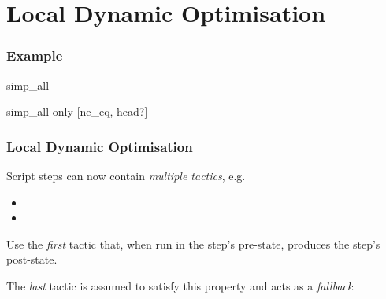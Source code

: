 \section{Local Dynamic Optimisation}

\begin{frame}[fragile]
  \frametitle{Example}

  \begin{minipage}{.2\textwidth}
    \begin{leancode}
      simp_all
    \end{leancode}
  \end{minipage}
  \Longrightarrow
  \begin{minipage}{.5\textwidth}
    \begin{leancode}
      simp_all only [ne_eq, head?]
    \end{leancode}
  \end{minipage}
\end{frame}

\begin{frame}
  \frametitle{Local Dynamic Optimisation}

  Script steps can now contain \emph{multiple tactics}, e.g.
  \begin{itemize}
    \item {}
    \item {}
  \end{itemize}

  \pause

  Use the \emph{first} tactic that, when run in the step's pre-state, produces the step's post-state.

  \pause

  The \emph{last} tactic is assumed to satisfy this property and acts as a \emph{fallback}.
\end{frame}


